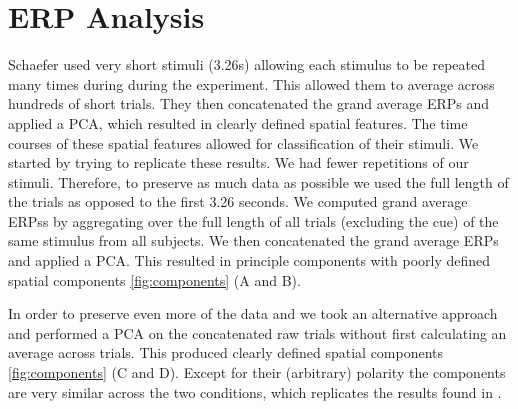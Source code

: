 \chapter*{ERP Analysis}
Schaefer \etal \cite{schaefer_name_2011} used very short stimuli (3.26s) allowing each stimulus to be repeated many times during during the experiment. 
This allowed them to average across hundreds of short trials. 
They then concatenated the grand average ERPs and applied a \ac{PCA}, which resulted in clearly defined spatial features. The time courses of these spatial features allowed for classification of their stimuli. We started by trying to replicate these results. 
We had fewer repetitions of our stimuli. Therefore, to preserve as much data as possible we used the full length of the trials as opposed to the first 3.26 seconds. We computed grand average \acp{ERP}s by aggregating over the full length of all trials (excluding the cue) of the same stimulus from all subjects. We then concatenated the grand average \acp{ERP} and applied a \ac{PCA}. This resulted in principle components with poorly defined spatial components \autoref{fig:components} (A and B).

In order to preserve even more of the data and we took an alternative approach and performed a \ac{PCA} on the concatenated raw trials without first calculating an average across trials. This produced clearly defined spatial components \autoref{fig:components} (C and D). Except for their (arbitrary) polarity the components are very similar across the two conditions, which replicates the results found in \cite{schaefer_name_2011}.

